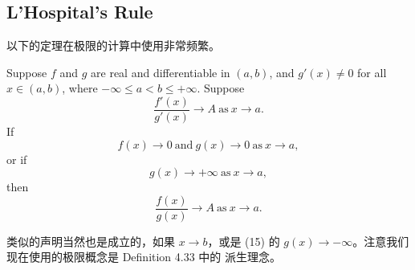 \documentclass[../poma-notes.tex]{subfiles}
\begin{document}
\subsection*{L'Hospital's Rule}

以下的定理在极限的计算中使用非常频繁。

\begin{theorem}
  Suppose $f$ and $g$ are real and differentiable in $(a, b)$, and $g'(x) \ne 0$ for all $x \in (a,b)$, where
  $-\infty \le a < b \le +\infty$. Suppose
  \begin{equation}
    \frac{f'(x)}{g'(x)} \to A \ \text{as} \ x \to a.
  \end{equation}
  If
  \begin{equation}
    f(x) \to 0 \ \text{and} \ g(x) \to 0 \ \text{as} \ x \to a,
  \end{equation}
  or if
  \begin{equation}
    g(x) \to +\infty \ \text{as} \ x \to a,
  \end{equation}
  then
  \begin{equation}
    \frac{f(x)}{g(x)} \to A \ \text{as} \ x \to a.
  \end{equation}
\end{theorem}

类似的声明当然也是成立的，如果 $x \to b$，或是 (15) 的 $g(x) \to -\infty$。注意我们现在使用的极限概念是 Definition 4.33 中的
派生理念。
\end{document}
